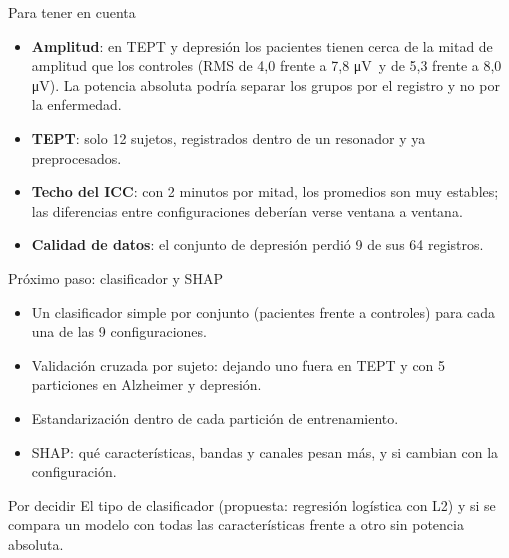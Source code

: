 \documentclass[aspectratio=169,11pt]{beamer}
\newcommand{\uV}{\si{\micro\volt}}
\begin{document}
\begin{frame}{Para tener en cuenta}
  \begin{itemize}
    \item \textbf{Amplitud}: en TEPT y depresión los pacientes tienen cerca de la mitad de amplitud que los controles (RMS de 4,0 frente a 7,8 \uV\ y de 5,3 frente a 8,0 \uV). La potencia absoluta podría separar los grupos por el registro y no por la enfermedad.
    \item \textbf{TEPT}: solo 12 sujetos, registrados dentro de un resonador y ya preprocesados.
    \item \textbf{Techo del ICC}: con 2 minutos por mitad, los promedios son muy estables; las diferencias entre configuraciones deberían verse ventana a ventana.
    \item \textbf{Calidad de datos}: el conjunto de depresión perdió 9 de sus 64 registros.
  \end{itemize}
\end{frame}

\begin{frame}{Próximo paso: clasificador y SHAP}
  \begin{itemize}
    \item Un clasificador simple por conjunto (pacientes frente a controles) para cada una de las 9 configuraciones.
    \item Validación cruzada \alert{por sujeto}: dejando uno fuera en TEPT y con 5 particiones en Alzheimer y depresión.
    \item Estandarización dentro de cada partición de entrenamiento.
    \item SHAP: qué características, bandas y canales pesan más, y si cambian con la configuración.
  \end{itemize}
  \vspace{2mm}
  \begin{block}{Por decidir}
    El tipo de clasificador (propuesta: regresión logística con L2) y si se compara un modelo con todas las características frente a otro sin potencia absoluta.
  \end{block}
\end{frame}
\end{document}
